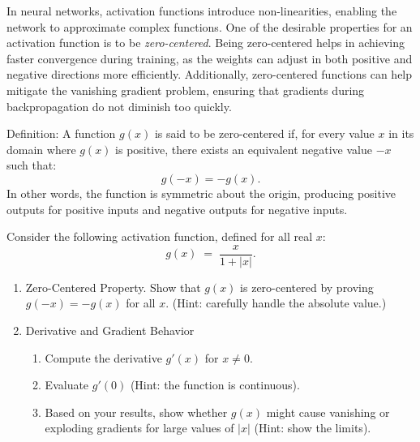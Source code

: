 In neural networks, activation functions introduce non-linearities, enabling the network to approximate complex functions. One of the desirable properties for an activation function is to be \emph{zero-centered}. Being zero-centered helps in achieving faster convergence during training, as the weights can adjust in both positive and negative directions more efficiently. Additionally, zero-centered functions can help mitigate the vanishing gradient problem, ensuring that gradients during backpropagation do not diminish too quickly.

Definition: A function \( g(x) \) is said to be zero-centered if, for every value \( x \) in its domain where \( g(x) \) is positive, there exists an equivalent negative value \( -x \) such that:
\[
  g(-x) = -g(x).
\]
In other words, the function is symmetric about the origin, producing positive outputs for positive inputs and negative outputs for negative inputs.

Consider the following activation function, defined for all real \(x\):
\[
  g(x) \;=\; \frac{x}{1 + |x|}.
\]

\begin{enumerate}
  \item Zero-Centered Property.
  Show that \( g(x) \) is zero-centered by proving \( g(-x) = -g(x) \) for all \( x \). 
  (Hint: carefully handle the absolute value.)

  \item Derivative and Gradient Behavior
    \begin{enumerate}
      \item Compute the derivative \( g'(x) \) for \( x \neq 0 \).
      \item Evaluate \( g'(0) \) (Hint: the function is continuous).
      \item Based on your results, show whether \( g(x) \) might cause vanishing or exploding gradients for large values of \( |x| \) (Hint: show the limits).
    \end{enumerate}
\end{enumerate}
